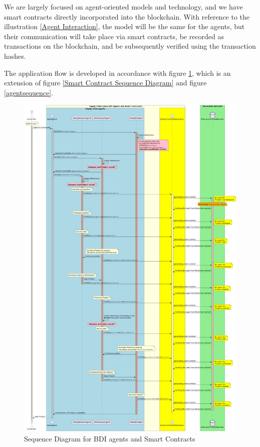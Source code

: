  We are largely focused on agent-oriented models and technology, and we have smart contracts directly incorporated into the blockchain. With reference to the illustration \ref{Agent Interaction}, the model will be the same for the agents, but their communication will take place via smart contracts, be recorded as transactions on the blockchain, and be subsequently verified using the transaction hashes.

 \vspace{.5cm}
The application flow is developed in accordance with figure \ref{Sequence Diagram for BDI agents and Smart Contracts}, which is an extension of figure \ref{Smart Contract Sequence Diagram} and figure \ref{agentsequence}.

 \begin{figure}[h!]
\centering
  \includegraphics[width=15cm]{includes/figures/sqdgm.png} 
  \caption{Sequence Diagram for \ac{BDI} agents and Smart Contracts}
  \label{Sequence Diagram for BDI agents and Smart Contracts}
\end{figure}

